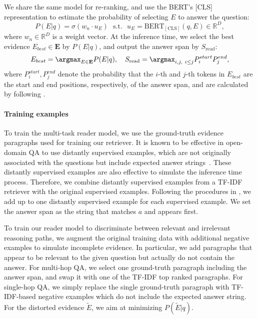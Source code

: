 We share the same model for re-ranking, and use the BERT's [CLS] representation to estimate the probability of selecting $E$ to answer the question:
\begin{equation}
    \label{eq:re-ranking}
    P(E|q) = \sigma(w_{n} \cdot u_{E}) ~~~\mathrm{s.t.}~~~ u_{E} = \mathrm{BERT}_\mathrm{[CLS]}(q, E) \in\mathbb{R}^{D},
\end{equation}
where $w_{n} \in \mathbb{R}^{D}$ is a weight vector.
At the inference time, we select the best evidence $E_{best} \in \mathbf{E}$ by $P(E|q)$, and output the answer span by $S_\mathrm{read}$:
\begin{equation}
E_{best} = \argmax_{E \in \mathbf{E}}P(E|q), ~~~S_\mathrm{read} = \argmax_{i,j,~i\leq j}P^{start}_i P^{end}_j,
\end{equation}
where $P^{start}_i, P^{end}_j$ denote the probability that the $i$-th and $j$-th tokens in $E_{best}$ are the start and end positions, respectively, of the answer span,
and are calculated by following \citet{devlin2018bert}.

\vspace{-2mm}\paragraph{Training examples}
To train the multi-task reader model, we use the ground-truth evidence paragraphs used for training our retriever. 
It is known to be effective in open-domain QA to use distantly supervised examples, which are not originally associated with the questions but include expected answer strings~\citep{chen2017reading,wang2018r,hu2019retrieve}.
These distantly supervised examples are also effective to simulate the inference time process. 
Therefore, we combine distantly supervised examples from a TF-IDF retriever with the original supervised examples. 
Following the procedures in \cite{chen2017reading}, we add up to one distantly supervised example for each supervised example. 
We set the answer span as the string that matches $a$ and appears first.

To train our reader model to discriminate between relevant and irrelevant reasoning paths, we augment the original training data with additional negative examples to simulate incomplete evidence.
In particular, we add paragraphs that appear to be relevant to the given question but actually do not contain the answer.
For multi-hop QA, we select one ground-truth paragraph including the answer span, and swap it with one of the TF-IDF top ranked paragraphs.
For single-hop QA, we simply replace the single ground-truth paragraph with TF-IDF-based negative examples which do not include the expected answer string. 
For the distorted evidence $\tilde{E}$, we aim at minimizing $P(\tilde{E}|q)$.

